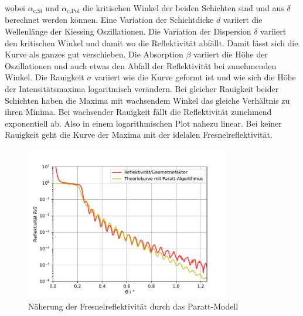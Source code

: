 wobei $\alpha_{\text{c,Si}}$ und $\alpha_{\text{c,Pol}}$ die kritischen Winkel der beiden Schichten sind und aus  $\delta$ berechnet werden können.
Eine Variation der Schichtdicke $d$ variiert die Wellenlänge der Kiessing Oszillationen. Die Variation der Dispersion $\delta$ variiert den kritischen Winkel
und damit wo die Reflektivität abfällt. Damit lässt sich die Kurve als ganzes gut verschieben. Die Absorption $\beta$ variiert die Höhe der Oszillationen und auch etwas den Abfall der Reflektivität bei 
zunehmenden Winkel. Die Rauigkeit $\sigma$ variiert wie die Kurve geformt ist und wie sich die Höhe der Intensitätsmaxima logaritmisch verändern.
Bei gleicher Rauigkeit beider Schichten haben die Maxima mit wachsendem Winkel das gleiche Verhältnis zu ihren Minima. Bei wachsender Rauigkeit fällt 
die Reflektivität zunehmend exponentiell ab. Also in einem logarithmischen Plot nahezu linear. Bei keiner Rauigkeit geht die Kurve der Maxima mit der idelalen Fresnelreflektivität.
\begin{figure}[H]
    \centering
    \includegraphics[width=0.8\textwidth]{plots/Parattplot.pdf}
    \caption{Näherung der Fresnelreflektivität durch das Paratt-Modell}
    \label{fig:Parattplot}
\end{figure}



